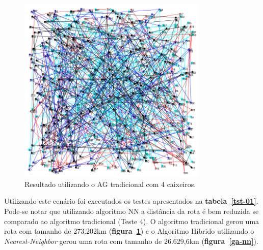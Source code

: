 \documentclass{abnt}
\begin{document}
		\begin{figure}[h]
				\centering
		        \includegraphics[width = 9cm,keepaspectratio]{img/ga-ale.png}
		        \caption{Resultado utilizando o AG tradicional com 4 caixeiros.}
		        \label{ga-ale}
	   	\end{figure}
	
	
		Utilizando este cenário foi executados os testes apresentados na \textbf{tabela~\ref{tst-01}}. Pode-se notar que utilizando algoritmo NN a distância da rota é bem reduzida se comparado ao algoritmo tradicional (Teste 4).  O algoritmo tradicional gerou uma rota com tamanho de 273.202km (\textbf{figura~\ref{ga-ale}}) e o Algoritmo Híbrido utilizando o \textit{Nearest-Neighbor} gerou uma rota com tamanho de 26.629,6km (\textbf{figura~\ref{ga-nn}}). 
		
\end{document}
